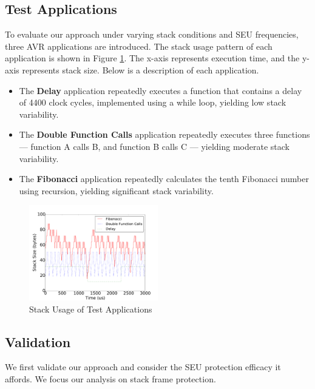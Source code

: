 \subsection{Test Applications}

To evaluate our approach under varying stack conditions and SEU frequencies, three AVR applications are introduced. The stack usage pattern of each application is shown in Figure \ref{fig:stacksize_usage}. The x-axis represents execution time, and the y-axis represents stack size. Below is a description of each application.

\begin{itemize}
\item The \textbf{Delay} application repeatedly executes a function that contains a delay of 4400 clock cycles, implemented using a while loop, yielding low stack variability.
\item The \textbf{Double Function Calls} application repeatedly executes three functions --- function A calls B, and function B calls C --- yielding moderate stack variability.
\item The \textbf{Fibonacci} application repeatedly calculates the tenth Fibonacci number using recursion, yielding significant stack variability.
\end{itemize}

\begin{figure}[H]
\centering
\includegraphics[width=0.5\textwidth]{figures/stacksize_usage_v3.pdf}
\caption{Stack Usage of Test Applications}
\label{fig:stacksize_usage}
\end{figure}

\subsection{Validation}

We first validate our approach and consider the SEU protection efficacy it affords. We focus our analysis on stack frame protection. 

